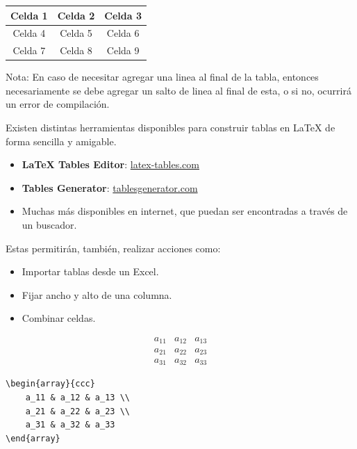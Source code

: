 \documentclass[../notes.tex]{subfiles}
\begin{document}
\begin{tabular}{|c|c c|}
    \hline
    Celda 1 & Celda 2 & Celda 3 \\
    \hline
    Celda 4 & Celda 5 & Celda 6 \\  
    Celda 7 & Celda 8 & Celda 9 \\
    \hline
\end{tabular}
    Nota: En caso de necesitar agregar una linea al final de la tabla, entonces necesariamente se debe agregar un salto de linea al final de esta, o si no, ocurrirá un error de compilación.
    
        Existen distintas herramientas disponibles para construir tablas en \LaTeX{} de forma sencilla y amigable.

            \begin{itemize}
                \item \textbf{LaTeX Tables Editor}: \href{https://www.latex-tables.com/}{latex-tables.com}
                \item \textbf{Tables Generator}: \href{https://www.tablesgenerator.com/latex_tables}{tablesgenerator.com}
                \item Muchas más disponibles en internet, que puedan ser encontradas a través de un buscador.
            \end{itemize}

        Estas permitirán, también, realizar acciones como:
            \begin{itemize}
                \item Importar tablas desde un Excel.
                \item Fijar ancho y alto de una columna.
                \item Combinar celdas.
            \end{itemize}
            
    \[
    	\begin{array}{ccc}
            a_11 & a_12 & a_13 \\
            a_21 & a_22 & a_23 \\  
            a_31 & a_32 & a_33
        \end{array}
    \]
\begin{verbatim}
\begin{array}{ccc}
    a_11 & a_12 & a_13 \\
    a_21 & a_22 & a_23 \\  
    a_31 & a_32 & a_33
\end{array}
\end{verbatim}
\end{document}
